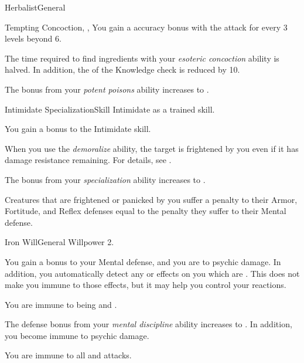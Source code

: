 \begin{feat}{Herbalist}{General}
\begin{magicalattuneability}{Tempting Concoction}{, , }
            \rankline
            You gain a  accuracy bonus with the attack for every 3 levels beyond 6.
        \end{magicalattuneability}

         The time required to find ingredients with your \textit{esoteric concoction} ability is halved.
        In addition, the  of the Knowledge check is reduced by 10.

         The bonus from your \textit{potent poisons} ability increases to .
    \end{feat}

    \begin{feat}{Intimidate Specialization}{Skill}
        \featpre Intimidate as a trained skill.

         You gain a  bonus to the Intimidate skill.

         When you use the \textit{demoralize} ability, the target is frightened by you even if it has damage resistance remaining.
        For details, see .

         The bonus from your \textit{specialization} ability increases to .

         Creatures that are frightened or panicked by you suffer a penalty to their Armor, Fortitude, and Reflex defenses equal to the penalty they suffer to their Mental defense.
    \end{feat}

    \begin{feat}{Iron Will}{General}
        \featpre Willpower 2.

         You gain a  bonus to your Mental defense, and you are \impervious to psychic damage.
        In addition, you automatically detect any  or  effects on you which are .
        This does not make you immune to those effects, but it may help you control your reactions.

         You are immune to being \stunned and \confused.

         The defense bonus from your \textit{mental discipline} ability increases to .
        In addition, you become immune to psychic damage.

         You are immune to all  and  attacks.
    \end{feat}

